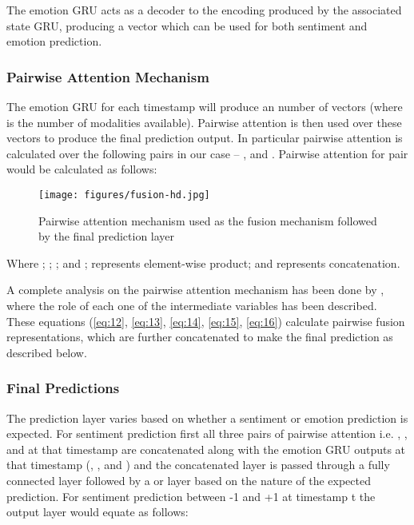 \documentclass[11pt,a4paper]{article}
\begin{document}
The emotion GRU acts as a decoder to the encoding produced by the associated state GRU, producing a vector which can be used for both sentiment and emotion prediction.

\subsubsection{Pairwise Attention Mechanism}

The emotion GRU for each timestamp will produce an  number of vectors (where  is the number of modalities available). Pairwise attention is then used over these  vectors to produce the final prediction output. In particular pairwise attention is calculated over the following pairs in our case – , and . Pairwise attention for pair  would be calculated as follows:

\begin{figure}[htbp]
	\centering
		\texttt{[image: figures/fusion-hd.jpg]}    
    \caption[fusion]{Pairwise attention mechanism used as the fusion mechanism followed by the final prediction layer}
	\label{fig:fusion}
\end{figure}







Where ; ; ; and ;   represents element-wise product; and  represents concatenation.

A complete analysis on the pairwise attention mechanism has been done by \citet{ghosal}, where the role of each one of the intermediate variables has been described. These equations (\ref{eq:12}, \ref{eq:13}, \ref{eq:14}, \ref{eq:15}, \ref{eq:16}) calculate  pairwise fusion representations, which are further concatenated to make the final prediction as described below.

\subsubsection{Final Predictions}
The prediction layer varies based on whether a sentiment or emotion prediction is expected. For sentiment prediction first all three pairs of pairwise attention i.e. , , and  at that timestamp are concatenated along with the emotion GRU outputs at that timestamp (, , and ) and the concatenated layer is passed through a fully connected layer followed by a  or  layer based on the nature of the expected prediction. For sentiment prediction between -1 and +1 at timestamp t the output layer would equate as follows:
\end{document}
